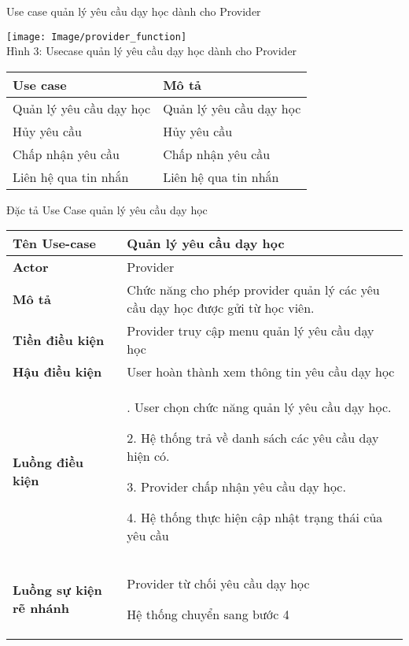 \documentclass[12pt,a4paper]{report}
\begin{document}
\newpage 
 Use case quản lý yêu cầu dạy học dành cho Provider
 
 \begin{center}
    \begin{center}
     \texttt{[image: Image/provider\_function]}\\
     Hình 3: Usecase quản lý yêu cầu dạy học dành cho Provider
    \end{center}
\end{center}
 \begin{center}
 \begin{tabular}{|>{\raggedright\arraybackslash}m{4cm}|>{\raggedright\arraybackslash}m{11.5cm}|}
\hline 
\textbf{Use case} & \textbf{Mô tả} \\ 
\hline 
Quản lý yêu cầu dạy học & Quản lý yêu cầu dạy học \\ 
\hline 
Hủy yêu cầu  & Hủy yêu cầu\\ 
\hline 
Chấp nhận yêu cầu & Chấp nhận yêu cầu \\ 
\hline
Liên hệ qua tin nhắn & Liên hệ qua tin nhắn \\ 
\hline 
\end{tabular}
 \end{center} 
 
 Đặc tả Use Case quản lý yêu cầu dạy học
 
 \begin{center}
 \begin{tabular}{|>{\raggedright\arraybackslash}m{4cm}|>{\raggedright\arraybackslash}m{11.5cm}|}
 \hline 
 \textbf{Tên Use-case} & Quản lý yêu cầu dạy học \\ 
 \hline 
 \textbf{Actor} & Provider \\ 
 \hline 
\textbf{ Mô tả} & Chức năng cho phép provider quản lý các yêu cầu dạy học
được gửi từ học viên. \\ 
 \hline 
 \textbf{Tiền điều kiện} & Provider truy cập menu quản lý yêu cầu dạy học\\ 
 \hline 
 \textbf{Hậu điều kiện} & User hoàn thành xem thông tin yêu cầu dạy học  \\ 
 \hline 
 \textbf{Luồng điều kiện} & 1. User chọn chức năng quản lý yêu cầu dạy học.
 
				   2. Hệ thống trả về danh sách các yêu cầu dạy hiện có.

			       3.  Provider chấp nhận yêu cầu dạy học.

				   4. Hệ thống thực hiện cập nhật trạng thái của yêu cầu\\ 
 \hline 
 \textbf{Luồng sự kiện rẽ nhánh} & Provider từ chối yêu cầu dạy học
 
						Hệ thống chuyển sang bước 4\\ 
 \hline 
 \end{tabular} 
 \end{center}
 
\end{document}

